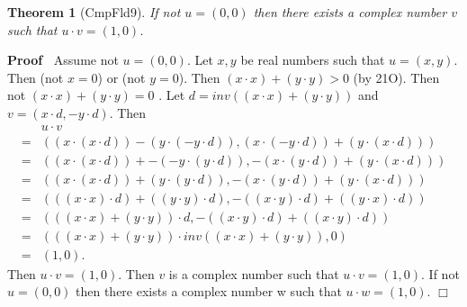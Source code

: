 \documentclass{article}
\newenvironment{forthel}{\begin{leftbar}}{\end{leftbar}}
\newenvironment{proof}{\noindent\textbf{Proof\ }}{\hspace*{\fill}$\Box$\medskip}
\newtheorem{theorem}{Theorem}
\newcommand{\cmul}{\cdot}
\begin{document}
\begin{forthel}
\begin{theorem}[CmpFld9] If not $u = (0,0)$ then there exists a complex number $v$ such that $u \cmul v = (1,0)$.
\end{theorem}\begin{proof}
 Assume not $u = (0,0)$.\newline
Let $x,y$ be real numbers such that $u = (x,y)$.\newline
Then (not $x=0$) or (not $y=0$).\newline
Then $(x \cdot x) + (y \cdot y) > 0$ (by 21O).\newline
Then not $(x \cdot x) + (y \cdot y) = 0$ .\newline
Let $d = inv((x \cdot x) + (y \cdot y))$ and  $v = (x \cdot d , -y \cdot d)$. \newline
Then \begin{align*}
&u \cmul v \\
= &( (x \cdot (x \cdot d)) - (y \cdot (-y \cdot d)) , (x \cdot (-y \cdot d)) + (y \cdot (x \cdot d)))\\
= &( (x \cdot (x \cdot d)) + -(-y \cdot (y \cdot d)) , -(x \cdot (y \cdot d)) + (y \cdot (x \cdot d)))\\
= &( (x \cdot (x \cdot d)) + (y \cdot (y \cdot d)) , -(x \cdot (y \cdot d)) + (y \cdot (x \cdot d)))\\
= &( ((x \cdot x) \cdot d) + ((y \cdot y) \cdot d) , -((x \cdot y) \cdot d) + ((y \cdot x) \cdot d))\\
= &( ((x \cdot x) + (y \cdot y)) \cdot d , -((x \cdot y) \cdot d) + ((x \cdot y) \cdot d))\\
= &( ((x \cdot x) + (y \cdot y)) \cdot inv((x \cdot x) + (y \cdot y)) , 0)\\
= &(1,0).
\end{align*}
Then $u \cmul v = (1,0)$.\newline
Then $v$ is a complex number such that $u \cmul v = (1,0)$.\newline
If not $u = (0,0)$ then there exists a complex number w such that $u \cmul w = (1,0)$.
\end{proof}






\end{forthel}
\end{document}
